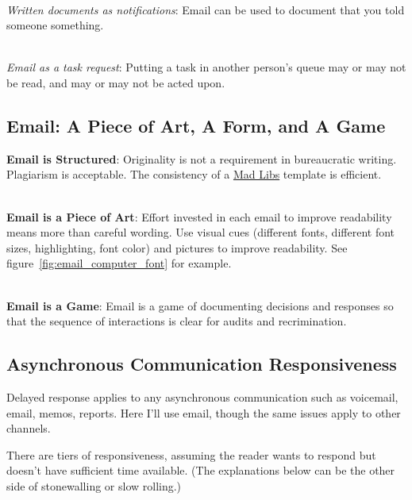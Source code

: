 \ \\
\textit{Written documents as notifications}: Email can be used to document that you told someone something. 

\ \\
\textit{Email as a task request}: Putting a task in another person's queue may or may not be read, and may or may not be acted upon. 





\subsection*{Email: A Piece of Art, A Form, and A Game\label{sec:art-form-game}}


\textbf{Email is Structured}: Originality is not a requirement in bureaucratic writing. Plagiarism is acceptable. The consistency of a 
\href{https://en.wikipedia.org/wiki/Mad_Libs}{Mad Libs} 
template is efficient.  

\ \\
\textbf{Email is a Piece of Art}: Effort invested in each email to improve readability means more than careful wording. 
Use visual cues (different fonts, different font sizes, highlighting, font color) and pictures to improve readability. See figure~\ref{fig:email_computer_font} for example.

\ \\
\textbf{Email is a Game}: Email is a game of documenting decisions and responses so that the sequence of interactions is clear for audits and recrimination. 

\subsection*{Asynchronous Communication Responsiveness\label{sec:email-responsiveness}}

Delayed response applies to any asynchronous communication such as voicemail, email, memos, reports. Here I'll use email, though the same issues apply to other channels.


There are tiers of responsiveness, assuming the reader wants to respond but doesn't have sufficient time available.
(The explanations below can be the other side of \gls{stonewalling} or \gls{slow rolling}.)

